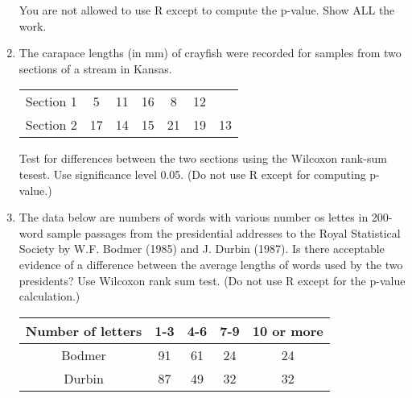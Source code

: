\documentclass[12pt]{article}
\begin{document}
\begin{enumerate}
You are not allowed to use R except to compute the p-value. Show ALL the work. 



\item The carapace lengths (in mm) of crayfish were recorded for samples from two sections of a stream in Kansas. 

\begin{table}[H]
\centering
\begin{tabular}{c c c c c c c}
\hline
Section 1 & 5 & 11 & 16&8&12&\\ [0.5ex]
Section 2 & 17&14&15&21&19&13\\[0.5ex]
\hline
\end{tabular}
\end{table}

Test for differences between the two sections using the Wilcoxon rank-sum tesest. Use significance level 0.05. (Do not use R except for computing p-value.)





\item The data below are numbers of words with various number os lettes in 200-word sample passages from the presidential addresses to the Royal Statistical Society by W.F. Bodmer (1985) and J. Durbin (1987). Is there acceptable evidence of a difference between the average lengths of words used by the two presidents? Use Wilcoxon rank sum test. (Do not use R except for the p-value calculation.)

\begin{table}[H]
\centering
\begin{tabular}{c c c c c}
\hline
Number of letters & 1-3 & 4-6 & 7-9 & 10 or more\\ [0.5ex]
\hline
Bodmer & 91 & 61 & 24 & 24\\[0.5ex]
Durbin&87&49&32&32\\[0.5ex]
\hline
\end{tabular}
\end{table}





\end{enumerate}
\end{document}
